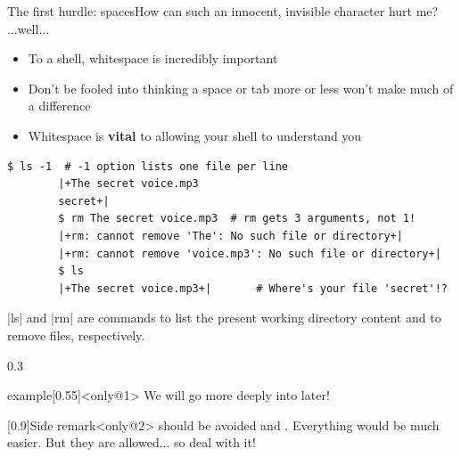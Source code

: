 \begin{frame}[fragile]{The first hurdle: spaces}{How can such an innocent, invisible character hurt me? ...well...}
    \vspace{-1mm}
    \begin{itemize}
        \item To a shell, whitespace is incredibly important
        \item Don't be fooled into thinking a space or tab more or less won't make much of a difference
        \item  Whitespace is \textbf{vital} to allowing your shell to understand you
    \end{itemize}
    \begin{lstlisting}[style=MyBash, aboveskip=4mm]
        $ ls -1  # -1 option lists one file per line
        |+The secret voice.mp3
        secret+|
        $ rm The secret voice.mp3  # rm gets 3 arguments, not 1!
        |+rm: cannot remove 'The': No such file or directory+|
        |+rm: cannot remove 'voice.mp3': No such file or directory+|
        $ ls
        |+The secret voice.mp3+|       # Where's your file 'secret'!?
    \end{lstlisting}
    \centerline{\ssmall \bash|ls| and \bash|rm| are commands to list the present working directory content and to remove files, respectively.}
    \begin{overlayarea}{\textwidth}{0.3\textheight}
        \begin{varblock}{example}[0.55\textwidth]{}<only@1>
            We will go more deeply into  later!
        \end{varblock}
        \begin{varblock}{}[0.9\textwidth]{Side remark}<only@2>
             should be avoided and . Everything would be much easier. But they are allowed... so deal with it!
        \end{varblock}
    \end{overlayarea}
\end{frame}
